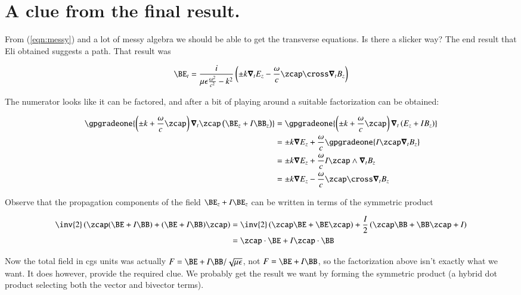 \section{A clue from the final result.}

From (\ref{eqn:messy}) and a lot of messy algebra we should be able to get the transverse equations.  Is there a slicker way?  The end result that Eli obtained suggests a path.  That result was

\begin{align}
\BE_t = \frac{i}{\mu\epsilon \frac{\omega^2}{c^2} - k^2} \left( \pm k \spacegrad_t E_z - \frac{\omega}{c} \zcap \cross \spacegrad_t B_z \right)
\end{align}

The numerator looks like it can be factored, and after a bit of playing around a suitable factorization can be obtained:

\begin{align*}
\gpgradeone{ \left( \pm k + \frac{\omega}{c} \zcap \right) \spacegrad_t \zcap \left( \BE_z + I \BB_z \right) }
&=
\gpgradeone{ \left( \pm k + \frac{\omega}{c} \zcap \right) \spacegrad_t \left( E_z + I B_z \right) } \\
&=
\pm k \spacegrad E_z + \frac{\omega}{c} \gpgradeone{ I \zcap \spacegrad_t B_z } \\
&=
\pm k \spacegrad E_z + \frac{\omega}{c} I \zcap \wedge \spacegrad_t B_z \\
&=
\pm k \spacegrad E_z - \frac{\omega}{c} \zcap \cross \spacegrad_t B_z \\
\end{align*}

Observe that the propagation components of the field $\BE_z + I\BE_z$ can be written in terms of the symmetric product

\begin{align*}
\inv{2} \left( \zcap (\BE + I\BB) + (\BE + I\BB) \zcap \right)
&=
\inv{2} \left( \zcap \BE + \BE \zcap \right) + \frac{I}{2} \left( \zcap \BB + \BB \zcap + I \right) \\
&=
\zcap \cdot \BE + I \zcap \cdot \BB
\end{align*}

Now the total field in cgs units was actually $F = \BE + I \BB/\sqrt{\mu\epsilon}$, not $F = \BE + I \BB$, so the factorization above isn't exactly what we want.   It does however, provide the required clue.  We probably get the result we want by forming the symmetric product (a hybrid dot product selecting both the vector and bivector terms).

